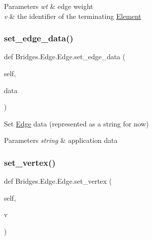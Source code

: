 \begin{DoxyParams}{Parameters}
{\em wt} & edge weight \\
\hline
{\em v} & the identifier of the terminating \mbox{\hyperlink{namespace_bridges_1_1_element}{Element}} \\
\hline
\end{DoxyParams}
\mbox{\label{class_bridges_1_1_edge_1_1_edge_a2ff2270572ae079d1db9e03c54c27056}} 
\subsubsection{\texorpdfstring{set\+\_\+edge\+\_\+data()}{set\_edge\_data()}}
{\footnotesize\ttfamily def Bridges.\+Edge.\+Edge.\+set\+\_\+edge\+\_\+data (\begin{DoxyParamCaption}\item[{}]{self,  }\item[{}]{data }\end{DoxyParamCaption})}



Set \mbox{\hyperlink{class_bridges_1_1_edge_1_1_edge}{Edge}} data (represented as a string for now) 


\begin{DoxyParams}{Parameters}
{\em string} & application data \\
\hline
\end{DoxyParams}
\mbox{\label{class_bridges_1_1_edge_1_1_edge_a2f96320e42e68653ead6ea4ef85a77ac}} 
\subsubsection{\texorpdfstring{set\+\_\+vertex()}{set\_vertex()}}
{\footnotesize\ttfamily def Bridges.\+Edge.\+Edge.\+set\+\_\+vertex (\begin{DoxyParamCaption}\item[{}]{self,  }\item[{}]{v }\end{DoxyParamCaption})}



